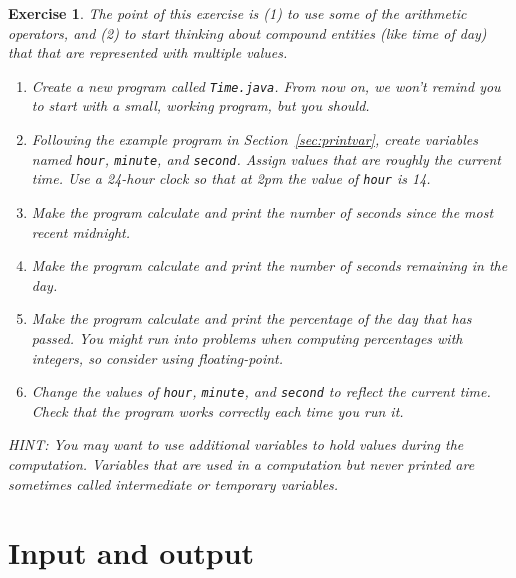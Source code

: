\documentclass[12pt]{book}
\theoremstyle{exercise}
\newtheorem{exercise}{Exercise}[chapter]
\newcommand{\java}[1]{\verb"#1"}
\newcommand{\java}[1]{\lstinline{#1}} %
\begin{document}
\begin{exercise}

The point of this exercise is (1) to use some of the arithmetic operators, and (2) to start thinking about compound entities (like time of day) that that are represented with multiple values.

\begin{enumerate}

\item Create a new program called {\tt Time.java}.
From now on, we won't remind you to start with a small, working program, but you should.

\item Following the example program in Section~\ref{sec:printvar}, create variables named \java{hour}, \java{minute}, and \java{second}.
Assign values that are roughly the current time.
Use a 24-hour clock so that at 2pm the value of \java{hour} is 14.

\item Make the program calculate and print the number of seconds since the most recent midnight.

\item Make the program calculate and print the number of seconds remaining in the day.

\item Make the program calculate and print the percentage of the day that has passed.
You might run into problems when computing percentages with integers, so consider using floating-point.

\item Change the values of \java{hour}, \java{minute}, and \java{second} to reflect the current time.
Check that the program works correctly each time you run it.

\end{enumerate}

HINT: You may want to use additional variables to hold values during the computation.
Variables that are used in a computation but never printed are sometimes called intermediate or temporary variables.

\end{exercise}


\chapter{Input and output}

\end{document}
